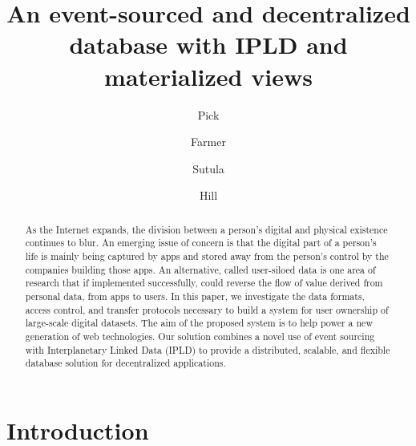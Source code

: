 \documentclass{textile}
\begin{document}
\pagecolor{white}

\title[An event-sourced and decentralized database with IPLD and materialized views]{An event-sourced and decentralized database with IPLD and materialized views}
\author{Pick}
\author{Farmer}
\author{Sutula}
\author{Hill}
 






\begin{abstract}
As the Internet expands, the division between a person's digital and physical existence continues to blur. An emerging issue of concern is that the digital part of a person's life is mainly being captured by apps and stored away from the person's control by the companies building those apps. An alternative, called user-siloed data is one area of research that if implemented successfully, could reverse the flow of value derived from personal data, from apps to users. In this paper, we investigate the data formats, access control, and transfer protocols necessary to build a system for user ownership of large-scale digital datasets. The aim of the proposed system is to help power a new generation of web technologies. Our solution combines a novel use of event sourcing with Interplanetary Linked Data (IPLD) to provide a distributed, scalable, and flexible database solution for decentralized applications.
\end{abstract}

\maketitle

\section{Introduction}
\end{document}
